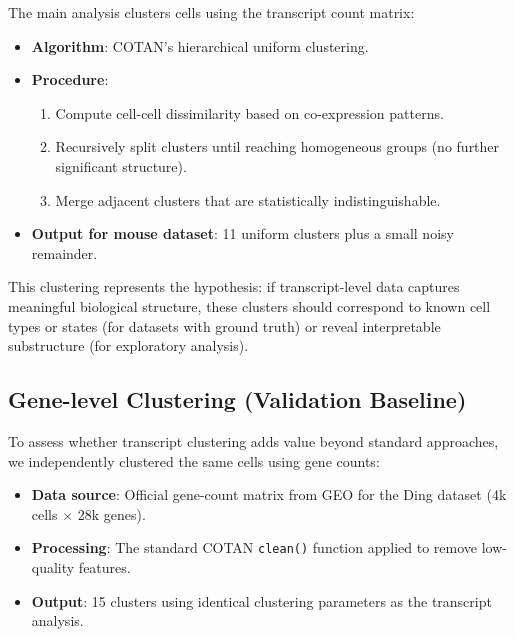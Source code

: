 The main analysis clusters cells using the transcript count matrix:

\begin{itemize}
    \item \textbf{Algorithm}: COTAN's hierarchical uniform clustering.
    \item \textbf{Procedure}:
    \begin{enumerate}
        \item Compute cell-cell dissimilarity based on co-expression patterns.
        \item Recursively split clusters until reaching homogeneous groups (no further significant structure).
        \item Merge adjacent clusters that are statistically indistinguishable.
    \end{enumerate}
    \item \textbf{Output for mouse dataset}: 11 uniform clusters plus a small noisy remainder.
\end{itemize}

This clustering represents the hypothesis: if transcript-level data captures meaningful biological structure, these clusters should correspond to known cell types or states (for datasets with ground truth) or reveal interpretable substructure (for exploratory analysis).

\subsection*{Gene-level Clustering (Validation Baseline)}

To assess whether transcript clustering adds value beyond standard approaches, we independently clustered the same cells using gene counts:

\begin{itemize}
    \item \textbf{Data source}: Official gene-count matrix from GEO for the Ding dataset (4k cells $\times$ 28k genes).
    \item \textbf{Processing}: The standard COTAN \texttt{clean()} function applied to remove low-quality features.
    \item \textbf{Output}: 15 clusters using identical clustering parameters as the transcript analysis.
\end{itemize}

